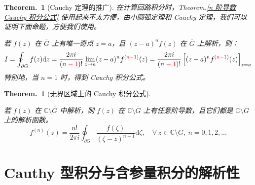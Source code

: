 \documentclass[UTF8]{report}
\def\C{\mathbb{C}}
\theoremstyle{MyLineTheoremStyle} %
\theoremstyle{MyBlockTheoremStyle} %
\newtheorem{BlockTheorem}[LineTheorem]{Theorem.\,} %
\theoremstyle{MySubsubsectionStyle} %
\begin{document}
\begin{BlockTheorem}[Cauchy 定理的推广]\label{Cauchy 定理的推广}
在计算回路积分时，Theorem.\ref{n 阶导数 Cauchy 积分公式} 使用起来不太方便，由小圆弧定理和 Cauchy 定理，我们可以证明下面命题，方便我们使用。

若 $f(z)$ 在 $\overline{G}$ 上有唯一奇点 $z = a$，且 $(z - a)^n f(z)$ 在  $\overline{G}$ 上解析，则：
\begin{equation}
I  = \oint_{\partial G} f(z) \mathrm{d}z = \frac{2 \pi i}{({\color{red} n-1})!}\lim_{z \to a} (z - a)^{n} f^{({\color{red} n-1})} (z) = \frac{2 \pi i}{({\color{red} n-1})!} \left[  (z - a)^{n} f^{({\color{red} n-1})} (z) \right]_{z = a}
\end{equation}
特别地，当 $n = 1$ 时，得到 Cauchy 积分公式。
\end{BlockTheorem}

\begin{BlockTheorem}[无界区域上的 Cauchy 积分公式]\label{无界区域上的 Cauchy 积分公式}

若 $f(z)$ 在 $ \C \setminus \overline{G} $ 中解析，则 $f(z)$ 在 $\C \setminus \overline{G}$ 上有任意阶导数，且它们都是 $\C \setminus \overline{G} $ 上的解析函数。
\begin{equation}
f^{(n)}(z) = \frac{n !}{2\pi i}\oint_{\partial G} \frac{f(\zeta)}{(\zeta - z)^{n+1}} \mathrm{d} \zeta,\quad \forall\ z \in\C \setminus \overline{G},\ n = 0,1,2,...
\end{equation} 

\end{BlockTheorem}

\section{Cauthy 型积分与含参量积分的解析性}
\end{document}
